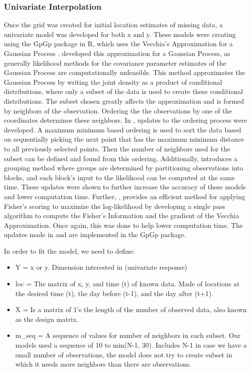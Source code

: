 \documentclass[12pt]{article}
\providecommand{\tightlist}{%
  \setlength{\itemsep}{0pt}\setlength{\parskip}{0pt}}
\begin{document}
\hypertarget{univariate-interpolation}{%
\subsubsection{Univariate
Interpolation}\label{univariate-interpolation}}

Once the grid was created for initial location estimates of missing
data, a univariate model was developed for both x and y. These models
were creating using the GpGp package in R, which uses the Vecchia's
Approximation for a Gaussian Process \citep{gpgp_pkg}.
\citet{vecchia1988estimation} developed this approximation for a
Gaussian Process, as generally likelihood methods for the covariance
parameter estimates of the Gaussian Process are computationally
unfeasible. This method approximates the Gaussian Process by writing the
joint density as a product of conditional distributions, where only a
subset of the data is used to create these conditional distributions.
The subset chosen greatly affects the approximation and is formed by
neighbors of the observation. Ordering the the observations by one of
the coordinates determines these neighbors. In
\citet{guinness_permutation_2018}, updates to the ordering process were
developed. A maximum minimum based ordering is used to sort the data
based on sequentially picking the next point that has the maximum
minimum distance to all previously selected points. Then the number of
neighbors used for the subset can be defined and found from this
ordering. Additionally, \citet{guinness_permutation_2018} introduces a
grouping method where groups are determined by partitioning observations
into blocks, and each block's input to the likelihood can be computed at
the same time. These updates were shown to further increase the accuracy
of these models and lower computation time. Further,
\citet{guinness_gaussian_2021}, provides an efficient method for
applying Fisher's scoring to maximize the log-likelihood by developing a
single pass algorithm to compute the Fisher's Information and the
gradient of the Vecchia Approximation. Once again, this was done to help
lower computation time. The updates made in
\citet{guinness_permutation_2018} and \citet{guinness_gaussian_2021} are
implemented in the GpGp package.

In order to fit the model, we need to define:

\begin{itemize}
\tightlist
\item
  Y = x or y. Dimension interested in (univariate response)
\item
  loc = The matrix of x, y, and time (t) of known data. Made of
  locations at the desired time (t), the day before (t-1), and the day
  after (t+1).
\item
  X = Is a matrix of 1's the length of the number of observed data, also
  known as the design matrix.
\item
  m\_seq = A sequence of values for number of neighbors in each subset.
  Our models used a sequence of 10 to min(N-1, 30). Includes N-1 in case
  we have a small number of observations, the model does not try to
  create subset in which it needs more neighbors than there are
  observations.
\end{itemize}
\end{document}
